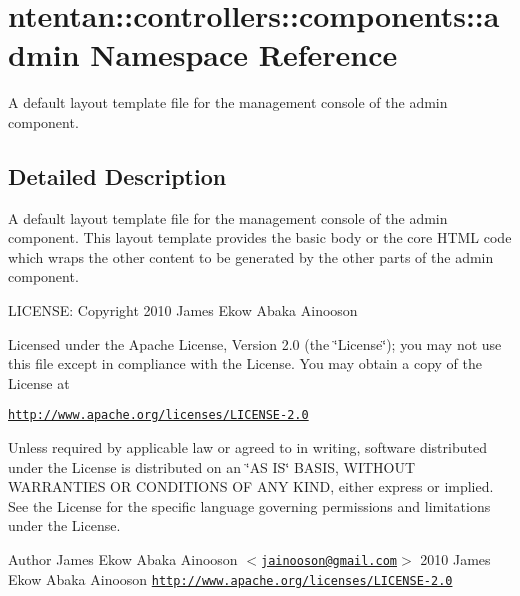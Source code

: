 \hypertarget{namespacententan_1_1controllers_1_1components_1_1admin}{
\section{ntentan::controllers::components::admin Namespace Reference}
\label{namespacententan_1_1controllers_1_1components_1_1admin}
}


A default layout template file for the management console of the admin component.  




\subsection{Detailed Description}
A default layout template file for the management console of the admin component. This layout template provides the basic body or the core HTML code which wraps the other content to be generated by the other parts of the admin component.

LICENSE: Copyright 2010 James Ekow Abaka Ainooson

Licensed under the Apache License, Version 2.0 (the \char`\"{}License\char`\"{}); you may not use this file except in compliance with the License. You may obtain a copy of the License at

\href{http://www.apache.org/licenses/LICENSE-2.0}{\tt http://www.apache.org/licenses/LICENSE-\/2.0}

Unless required by applicable law or agreed to in writing, software distributed under the License is distributed on an \char`\"{}AS IS\char`\"{} BASIS, WITHOUT WARRANTIES OR CONDITIONS OF ANY KIND, either express or implied. See the License for the specific language governing permissions and limitations under the License.

\begin{DoxyAuthor}{Author}
James Ekow Abaka Ainooson $<$\href{mailto:jainooson@gmail.com}{\tt jainooson@gmail.com}$>$  2010 James Ekow Abaka Ainooson  \href{http://www.apache.org/licenses/LICENSE-2.0}{\tt http://www.apache.org/licenses/LICENSE-\/2.0} 
\end{DoxyAuthor}
